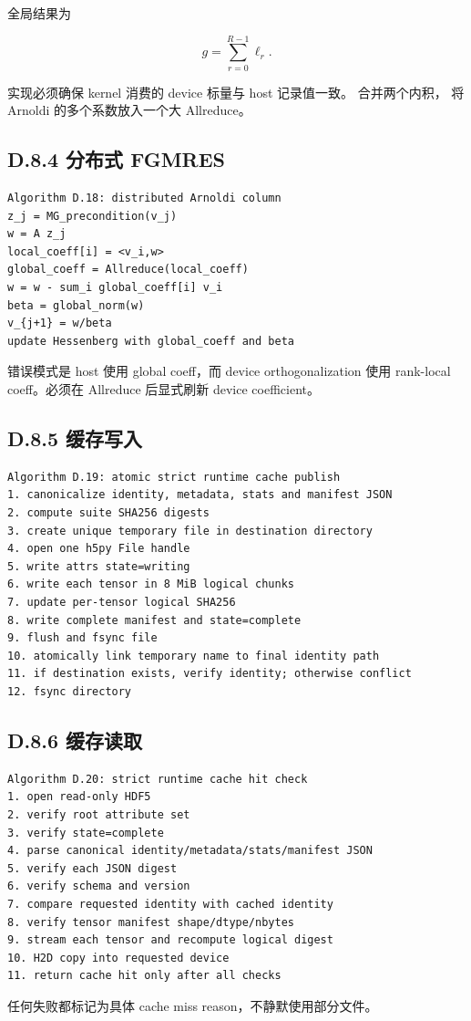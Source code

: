 \documentclass[UTF8,a4paper,10pt]{ctexart}
\DeclareRobustCommand{\pycode}[1]{\texorpdfstring{\texttt{\seqsplit{#1}}}{#1}}
\begin{document}
全局结果为

\begin{displaymath}
g=\sum_{r=0}^{R-1}\ell_r.
\end{displaymath}

实现必须确保 kernel 消费的 device 标量与 host 记录值一致。\pycode{dot\_pair} 合并两个内积，\pycode{dot\_many} 将 Arnoldi 的多个系数放入一个大 Allreduce。

\subsection{D.8.4 分布式 FGMRES}
\begin{Verbatim}[breaklines=true,breakanywhere=true,fontsize=\scriptsize]
Algorithm D.18: distributed Arnoldi column
z_j = MG_precondition(v_j)
w = A z_j
local_coeff[i] = <v_i,w>
global_coeff = Allreduce(local_coeff)
w = w - sum_i global_coeff[i] v_i
beta = global_norm(w)
v_{j+1} = w/beta
update Hessenberg with global_coeff and beta
\end{Verbatim}
错误模式是 host \pycode{Hessenberg} 使用 global coeff，而 device orthogonalization 使用 rank-local coeff。必须在 Allreduce 后显式刷新 device coefficient。

\subsection{D.8.5 缓存写入}
\begin{Verbatim}[breaklines=true,breakanywhere=true,fontsize=\scriptsize]
Algorithm D.19: atomic strict runtime cache publish
1. canonicalize identity, metadata, stats and manifest JSON
2. compute suite SHA256 digests
3. create unique temporary file in destination directory
4. open one h5py File handle
5. write attrs state=writing
6. write each tensor in 8 MiB logical chunks
7. update per-tensor logical SHA256
8. write complete manifest and state=complete
9. flush and fsync file
10. atomically link temporary name to final identity path
11. if destination exists, verify identity; otherwise conflict
12. fsync directory
\end{Verbatim}
\subsection{D.8.6 缓存读取}
\begin{Verbatim}[breaklines=true,breakanywhere=true,fontsize=\scriptsize]
Algorithm D.20: strict runtime cache hit check
1. open read-only HDF5
2. verify root attribute set
3. verify state=complete
4. parse canonical identity/metadata/stats/manifest JSON
5. verify each JSON digest
6. verify schema and version
7. compare requested identity with cached identity
8. verify tensor manifest shape/dtype/nbytes
9. stream each tensor and recompute logical digest
10. H2D copy into requested device
11. return cache hit only after all checks
\end{Verbatim}
任何失败都标记为具体 cache miss reason，不静默使用部分文件。
\end{document}
